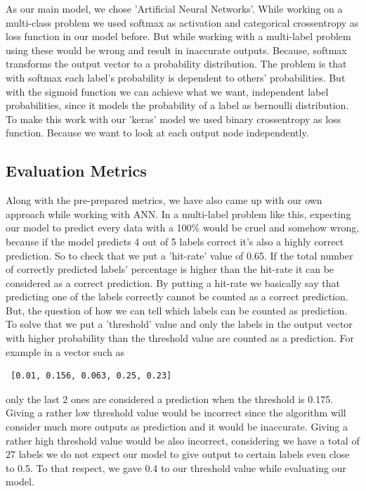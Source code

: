 \documentclass[10pt,twocolumn,letterpaper]{article}
\begin{document}
As our main model, we chose 'Artificial Neural Networks'. While working on a multi-class problem we used softmax as activation and categorical crossentropy as loss function in our model before. But while working with a multi-label problem using these would be wrong and result in inaccurate outputs. Because, softmax transforms the output vector to a probability distribution. The problem is that with softmax each label's probability is dependent to others' probabilities. But with the sigmoid function we can achieve what we want, independent label probabilities, since it models the probability of a label as bernoulli distribution. To make this work with our 'keras' model we used binary crossentropy as loss function. Because we want to look at each output node independently.

\subsection{Evaluation Metrics}
Along with the pre-prepared metrics, we have also came up with our own approach while working with ANN. In a multi-label problem like this, expecting our model to predict every data with a 100\% would be cruel and somehow wrong, because if the model predicts 4 out of 5 labels correct it's also a highly correct prediction. So to check that we put a 'hit-rate' value of 0.65. If the total number of correctly predicted labels' percentage is higher than the hit-rate it can be considered as a correct prediction. By putting a hit-rate we basically say that predicting one of the labels correctly cannot be counted as a correct prediction. But, the question of how we can tell which labels can be counted as prediction. To solve that we put a 'threshold' value and only the labels in the output vector with higher probability than the threshold value are counted as a prediction. For example in a vector such as
\begin{verbatim}
 [0.01, 0.156, 0.063, 0.25, 0.23]
\end{verbatim} 
only the last 2 ones are considered a prediction when the threshold is 0.175. Giving a rather low threshold value would be incorrect since the algorithm will consider much more outputs as prediction and it would be inaccurate. Giving a rather high threshold value would be also incorrect, considering we have a total of 27 labels we do not expect our model to give output to certain labels even close to 0.5. To that respect, we gave 0.4 to our threshold value while evaluating our model.
\end{document}

